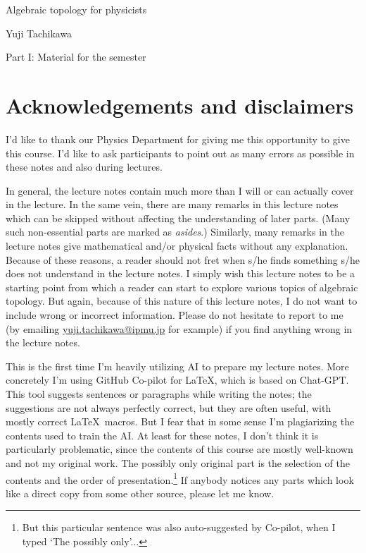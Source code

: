 \documentclass[12pt]{article}
\numberwithin{equation}{section}
\numberwithin{figure}{section}
\theoremstyle{remark}
\begin{document}
\centerline{\Large Algebraic topology for physicists}

\bigskip

\centerline{\large Yuji Tachikawa}

\setcounter{tocdepth}{2}
\tableofcontents

\newpage

\vbox{}

\vfill

{\LARGE Part I: Material for the semester}

\vfill

\vbox{}

\newpage

\section*{Acknowledgements and disclaimers}

I'd like to thank our Physics Department for giving me this opportunity to give this course.
I'd like to ask participants to point out as many errors as possible in these notes and also during lectures.

In general, the lecture notes contain much more than I will or can actually cover in the lecture. 
In the same vein, there are many remarks in this lecture notes which can be skipped without affecting the understanding of later parts. 
(Many such non-essential parts are marked as \emph{asides}.)
Similarly, many remarks in the lecture notes  give mathematical and/or physical facts without any explanation.
Because of these reasons, a reader should not fret  when s/he finds something s/he does not understand in the lecture notes.
I simply wish this lecture notes to be a starting point from which a reader can start to explore various topics of algebraic topology.
But again, because of this nature of this lecture notes, I do not want to include wrong or incorrect information. 
Please do not hesitate to report to me (by emailing \url{yuji.tachikawa@ipmu.jp} for example) if you find anything wrong in the lecture notes.

This is the first time I'm heavily utilizing AI to prepare my lecture notes.
More concretely I'm using GitHub Co-pilot for \LaTeX, which is based on Chat-GPT.
This tool suggests sentences or paragraphs while writing the notes;
the suggestions are not always perfectly correct, but they are often useful,
with mostly correct \LaTeX\ macros.
But I fear that in some sense I'm plagiarizing the contents used to train the AI.
At least for these notes, I don't think it is particularly problematic,
since the contents of this course are mostly well-known and not my original work.
The possibly only original part is the selection of the contents and the order of presentation.\footnote{%
But this particular sentence was also auto-suggested by Co-pilot, when I typed `The possibly only'...
}
If anybody notices any parts which look like a direct copy from some other source, please let me know.
\end{document}
